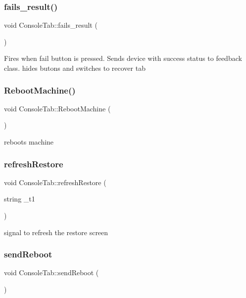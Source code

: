 \subsubsection{\texorpdfstring{fails\+\_\+result()}{fails\_result()}}
{\footnotesize\ttfamily void Console\+Tab\+::fails\+\_\+result (\begin{DoxyParamCaption}{ }\end{DoxyParamCaption})}

Fires when fail button is pressed. Sends device with success status to feedback class. hides butons and switches to recover tab \mbox{\label{classConsoleTab_a312dd40624d78a7d8506f97eb837c492}} 
\subsubsection{\texorpdfstring{Reboot\+Machine()}{RebootMachine()}}
{\footnotesize\ttfamily void Console\+Tab\+::\+Reboot\+Machine (\begin{DoxyParamCaption}{ }\end{DoxyParamCaption})}

reboots machine \mbox{\label{classConsoleTab_a34925515a836a363cf85b25860c795d6}} 
\subsubsection{\texorpdfstring{refresh\+Restore}{refreshRestore}}
{\footnotesize\ttfamily void Console\+Tab\+::refresh\+Restore (\begin{DoxyParamCaption}\item[{string}]{\+\_\+t1 }\end{DoxyParamCaption})\hspace{0.3cm}{\ttfamily [signal]}}

signal to refresh the restore screen \mbox{\label{classConsoleTab_af58a230f2f192469205839920dd7fa66}} 
\subsubsection{\texorpdfstring{send\+Reboot}{sendReboot}}
{\footnotesize\ttfamily void Console\+Tab\+::send\+Reboot (\begin{DoxyParamCaption}{ }\end{DoxyParamCaption})\hspace{0.3cm}{\ttfamily [signal]}}

